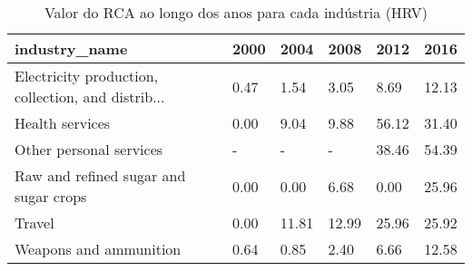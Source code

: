 \begin{table}
\centering
\caption{Valor do RCA ao longo dos anos para cada indústria (HRV)}
\begin{tabular}{p{6cm}p{1.5cm}p{1.5cm}p{1.5cm}p{1.5cm}p{1.5cm}}
\toprule
                                     industry\_name & 2000 &  2004 &  2008 &  2012 &  2016 \\
\midrule
Electricity production, collection, and distrib... & 0.47 &  1.54 &  3.05 &  8.69 & 12.13 \\
                                   Health services & 0.00 &  9.04 &  9.88 & 56.12 & 31.40 \\
                           Other personal services &    - &     - &     - & 38.46 & 54.39 \\
             Raw and refined sugar and sugar crops & 0.00 &  0.00 &  6.68 &  0.00 & 25.96 \\
                                            Travel & 0.00 & 11.81 & 12.99 & 25.96 & 25.92 \\
                            Weapons and ammunition & 0.64 &  0.85 &  2.40 &  6.66 & 12.58 \\
\bottomrule
\end{tabular}
\end{table}
